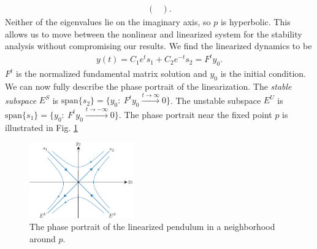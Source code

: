 \begin{ex}
\begin{align}
\begin{pmatrix}
		\end{pmatrix}.
	\end{align}
	Neither of the eigenvalues lie on the imaginary axis, so $p$ is hyperbolic. This allows us to move between the nonlinear and linearized system for the stability analysis without compromising our results. We find the linearized dynamics to be
	\begin{align}
		{y} (t) = C_1 e^{t} {s_1}  + C_2 e^{-t}{s_2} = F^{t}{y_0} .
	\end{align}
	$F^{t}$ is the normalized fundamental matrix solution and ${y_0} $ is the initial condition. We can now fully describe the phase portrait of the linearization. The \emph{stable subspace} $E^{S}$ is $ \textrm{span} \{{s_2} \} = \{{y_0} :\ F^{t}{y_0} \xrightarrow{t \to \infty} 0 \} $. The unstable subspace $E^{U}$ is $ \textrm{span} \{{s_1}\} = \{{y_0} : \ F^{t}{y_0} \xrightarrow{t \to - \infty }0\} $. The phase portrait near the fixed point $p$ is illustrated in Fig. \ref{fig:pend_phase_p}
\begin{figure}[h!]
	\centering
	\includegraphics[width=0.4\textwidth]{figures/ch2/17pend_phase_p}
	\caption{The phase portrait of the linearized pendulum in a neighborhood around ${p} $.}
	\label{fig:pend_phase_p}
\end{figure}


\end{ex}

